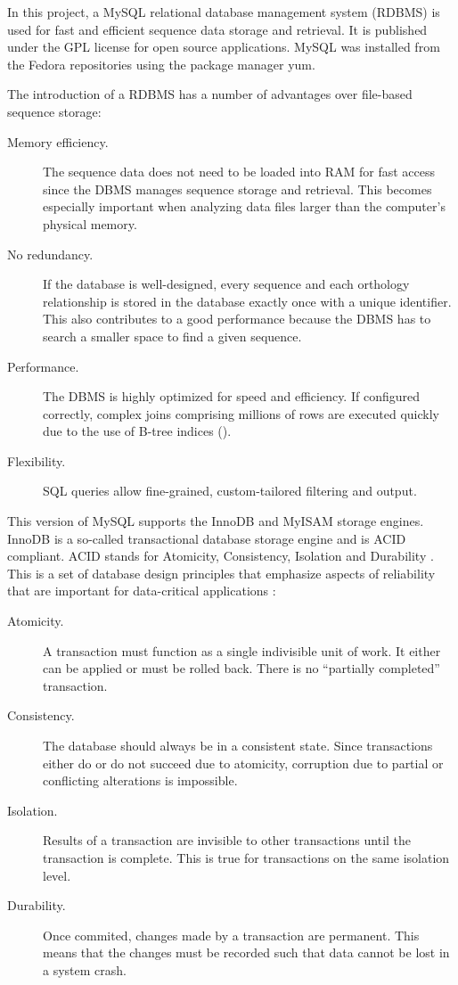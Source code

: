 In this project, a MySQL relational database management system (RDBMS) is used
for fast and efficient sequence data storage and retrieval. It is published
under the GPL license for open source applications. MySQL was installed from the
Fedora repositories using the package manager yum.

The introduction of a RDBMS has a number of advantages over file-based sequence
storage:

\begin{description}
	\item[Memory efficiency.] The sequence data does not need to be loaded into
		RAM for fast access since the DBMS manages sequence storage and retrieval.
		This becomes especially important when analyzing data files larger than the
		computer's physical memory.
	\item[No redundancy.] If the database is well-designed, every sequence and
		each orthology relationship is stored in the database exactly once with a
		unique identifier. This also contributes to a good performance because the
		DBMS has to search a smaller space to find a given sequence.
	\item[Performance.] The DBMS is highly optimized for speed and efficiency. If
		configured correctly, complex joins comprising millions of rows are executed
		quickly due to the use of B-tree indices (\cite{comer1979}).
	\item[Flexibility.] SQL queries allow fine-grained, custom-tailored filtering
		and output.
\end{description}

This version of MySQL supports the InnoDB and MyISAM storage engines. InnoDB is
a so-called transactional database storage engine and is ACID compliant. ACID
stands for Atomicity, Consistency, Isolation and Durability \citep{haerder1983}.
This is a set of database design principles that emphasize aspects of
reliability that are important for data-critical applications
\citep{schwartz2012}:

\begin{description}
	\item[Atomicity.] A transaction must function as a single indivisible unit of
		work. It either can be applied or must be rolled back. There is no
		``partially completed'' transaction.
	\item[Consistency.] The database should always be in a consistent state. Since
		transactions either do or do not succeed due to atomicity, corruption due to
		partial or conflicting alterations is impossible.
	\item[Isolation.] Results of a transaction are invisible to other
		transactions until the transaction is complete. This is true for
		transactions on the same isolation level.
	\item[Durability.] Once commited, changes made by a transaction are permanent.
		This means that the changes must be recorded such that data cannot be lost
		in a system crash. 
\end{description}

